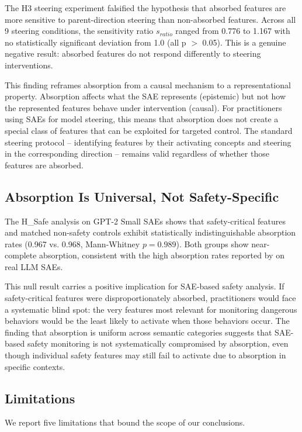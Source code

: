 \documentclass{article}
\begin{document}
The H3 steering experiment falsified the hypothesis that absorbed features are more sensitive to parent-direction steering than non-absorbed features. Across all 9 steering conditions, the sensitivity ratio $s_{ratio}$ ranged from 0.776 to 1.167 with no statistically significant deviation from 1.0 (all p $>$ 0.05). This is a genuine negative result: absorbed features do not respond differently to steering interventions.

This finding reframes absorption from a causal mechanism to a representational property. Absorption affects what the SAE represents (epistemic) but not how the represented features behave under intervention (causal). For practitioners using SAEs for model steering, this means that absorption does not create a special class of features that can be exploited for targeted control. The standard steering protocol -- identifying features by their activating concepts and steering in the corresponding direction -- remains valid regardless of whether those features are absorbed.

\subsection{Absorption Is Universal, Not Safety-Specific}

The H\_Safe analysis on GPT-2 Small SAEs shows that safety-critical features and matched non-safety controls exhibit statistically indistinguishable absorption rates (0.967 vs. 0.968, Mann-Whitney $p = 0.989$). Both groups show near-complete absorption, consistent with the high absorption rates reported by \citet{chanin2024} on real LLM SAEs.

This null result carries a positive implication for SAE-based safety analysis. If safety-critical features were disproportionately absorbed, practitioners would face a systematic blind spot: the very features most relevant for monitoring dangerous behaviors would be the least likely to activate when those behaviors occur. The finding that absorption is uniform across semantic categories suggests that SAE-based safety monitoring is not systematically compromised by absorption, even though individual safety features may still fail to activate due to absorption in specific contexts.

\subsection{Limitations}

We report five limitations that bound the scope of our conclusions.
\end{document}
